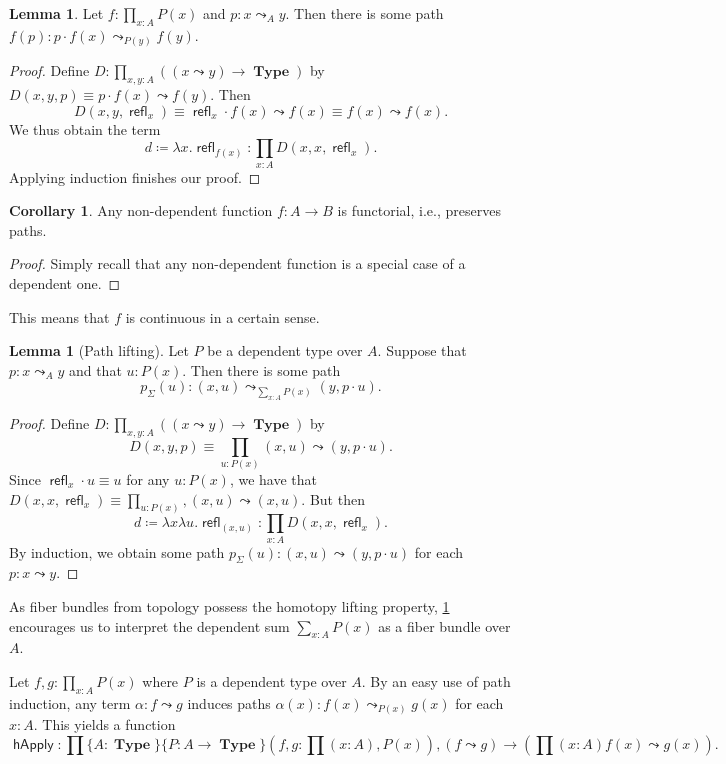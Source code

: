 \documentclass[10pt,letterpaper,cm]{nupset}
\theoremstyle{definition}
\theoremstyle{theorem}
\newtheorem{lemma}[definition]{Lemma}
\newtheorem{corollary}[definition]{Corollary}
\theoremstyle{remark}
\newcommand{\1}{\mathbf{1}}
\newcommand{\0}{\vec 0}
\DeclareMathOperator{\refl}{\mathsf{refl}}
\DeclareMathOperator{\happly}{\mathsf{hApply}}
\DeclareMathOperator{\type}{\mathbf{Type}}
\begin{document}
\begin{lemma}\label{LL}
Let $f: \prod_{x:A}P(x)$ and $p: x\leadsto_A y$. Then there is some path $f(p):p \cdot f(x) \leadsto_{P(y)} f(y)$.
\end{lemma}
\begin{proof}
Define $D: \prod_{x,y:A}\left((x\leadsto y) \to \type\right)$ by  $D(x,y,p) \equiv p\cdot f(x) \leadsto f(y)$. Then $$D(x,y,\refl_x) \equiv \refl_x \cdot f(x) \leadsto f(x) \equiv f(x) \leadsto f(x).$$ We thus obtain the term $$ d\coloneqq \lambda x.\refl_{f(x)}: \prod_{x:A}D(x,x,\refl_x).$$ Applying induction finishes our proof.
\end{proof}

\begin{corollary}
Any non-dependent function $f: A \to B$ is functorial, i.e., preserves paths.
\end{corollary}
\begin{proof}
Simply recall that any non-dependent function is a special case of a dependent one.
\end{proof}

This means that $f$ is continuous in a certain sense.

\smallskip

\begin{lemma}[Path lifting]
Let $P$ be a dependent type over $A$. Suppose that $p: x\leadsto_A y$ and that $u: P(x)$. Then there is some path $$p_{\Sigma}(u) : \left(x, u\right) \leadsto_{\sum_{x:A}P(x)}\left(y, p\cdot u\right).$$
\end{lemma}
\begin{proof}
Define $D: \prod_{x,y:A}\left( \left(x\leadsto y\right) \to \type\right)$ by  $$D(x,y,p) \equiv \prod_{u:P(x)} (x,u) \leadsto (y, p\cdot u).$$ Since $\refl_x \cdot u \equiv u$ for any $u: P(x)$, we have that $D(x, x, \refl_x) \equiv \prod_{u:P(x)}, (x,u) \leadsto (x,u)$. But then $$ d\coloneqq\lambda x\lambda u. \refl_{(x,u)} : \prod_{x:A} D(x,x, \refl_x) .$$ By induction, we obtain some path $p_{\Sigma}(u) : (x,u)\leadsto (y, p \cdot u)$ for each $p: x\leadsto y$.
\end{proof}

As fiber bundles from topology possess the homotopy lifting property,  \cref{LL} encourages us to interpret the dependent sum $\sum_{x:A}P(x)$ as a fiber bundle over $A$.


Let $f,g: \prod_{x:A} P(x)$ where $P$ is a dependent type over $A$. By an easy use of path induction, any term $\alpha : f \leadsto g$ induces paths $\alpha(x) :f(x) \leadsto_{P(x)} g(x)$ for each $x:A$. This yields a function $$\happly : \prod \{A :\type\}\{P: A \to \type\}\left(f,g: \prod(x:A), P(x)\right), (f\leadsto g) \to \left(\prod(x:A) f(x)\leadsto g(x) \right).$$
\end{document}
